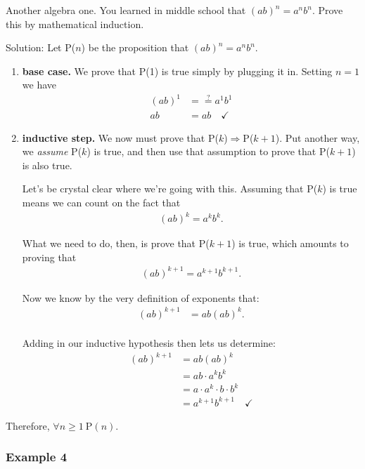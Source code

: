 Another algebra one. You learned in middle school that $(ab)^n=a^n b^n$.
Prove this by mathematical induction.

Solution: Let P($n$) be the proposition that $(ab)^n=a^n b^n$. 

\begin{enumerate}
\item \textbf{base case.} We prove that P(1) is true simply by plugging it
in. Setting $n=1$ we have
\begin{align*}
(ab)^1 &= \stackrel{?}{=} a^1 b^1 \\
ab &= ab \quad \checkmark
\end{align*}

\item \textbf{inductive step.}
We now must prove that P($k$)$\Rightarrow$P($k+1$). Put another way, we
\textit{assume} P($k$) is true, and then use that assumption to prove that
P($k+1$) is also true.

Let's be crystal clear where we're going with this. Assuming that P($k$) is
true means we can count on the fact that
\begin{align*}
(ab)^k = a^k b^k.
\end{align*}

What we need to do, then, is prove that P($k+1$) is true, which amounts to
proving that
\begin{align*}
(ab)^{k+1} = a^{k+1} b^{k+1}.
\end{align*}

Now we know by the very definition of exponents that:
\begin{align*}
(ab)^{k+1} &= ab(ab)^k. \\
\end{align*}

Adding in our inductive hypothesis then lets us determine:
\begin{align*}
(ab)^{k+1} &= ab(ab)^k \\
&= ab \cdot a^k b^k \\
&= a \cdot a^k \cdot b \cdot b^k \\
&= a^{k+1} b^{k+1} \quad \checkmark
\end{align*}
\end{enumerate}

Therefore, $\forall n\geq1 \ \text{P}(n)$.


\subsubsection{Example 4}

